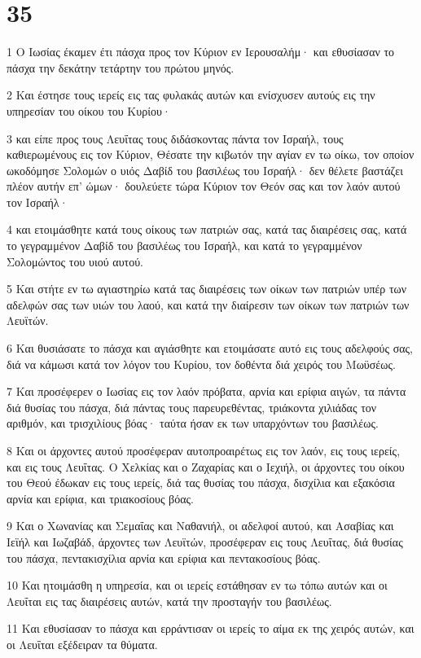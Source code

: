 \chapter{35}

\par 1 Ο Ιωσίας έκαμεν έτι πάσχα προς τον Κύριον εν Ιερουσαλήμ· και εθυσίασαν το πάσχα την δεκάτην τετάρτην του πρώτου μηνός.
\par 2 Και έστησε τους ιερείς εις τας φυλακάς αυτών και ενίσχυσεν αυτούς εις την υπηρεσίαν του οίκου του Κυρίου·
\par 3 και είπε προς τους Λευΐτας τους διδάσκοντας πάντα τον Ισραήλ, τους καθιερωμένους εις τον Κύριον, Θέσατε την κιβωτόν την αγίαν εν τω οίκω, τον οποίον ωκοδόμησε Σολομών ο υιός Δαβίδ του βασιλέως του Ισραήλ· δεν θέλετε βαστάζει πλέον αυτήν επ' ώμων· δουλεύετε τώρα Κύριον τον Θεόν σας και τον λαόν αυτού τον Ισραήλ·
\par 4 και ετοιμάσθητε κατά τους οίκους των πατριών σας, κατά τας διαιρέσεις σας, κατά το γεγραμμένον Δαβίδ του βασιλέως του Ισραήλ, και κατά το γεγραμμένον Σολομώντος του υιού αυτού.
\par 5 Και στήτε εν τω αγιαστηρίω κατά τας διαιρέσεις των οίκων των πατριών υπέρ των αδελφών σας των υιών του λαού, και κατά την διαίρεσιν των οίκων των πατριών των Λευϊτών.
\par 6 Και θυσιάσατε το πάσχα και αγιάσθητε και ετοιμάσατε αυτό εις τους αδελφούς σας, διά να κάμωσι κατά τον λόγον του Κυρίου, τον δοθέντα διά χειρός του Μωϋσέως.
\par 7 Και προσέφερεν ο Ιωσίας εις τον λαόν πρόβατα, αρνία και ερίφια αιγών, τα πάντα διά θυσίας του πάσχα, διά πάντας τους παρευρεθέντας, τριάκοντα χιλιάδας τον αριθμόν, και τρισχιλίους βόας· ταύτα ήσαν εκ των υπαρχόντων του βασιλέως.
\par 8 Και οι άρχοντες αυτού προσέφεραν αυτοπροαιρέτως εις τον λαόν, εις τους ιερείς, και εις τους Λευΐτας. Ο Χελκίας και ο Ζαχαρίας και ο Ιεχιήλ, οι άρχοντες του οίκου του Θεού έδωκαν εις τους ιερείς, διά τας θυσίας του πάσχα, δισχίλια και εξακόσια αρνία και ερίφια, και τριακοσίους βόας.
\par 9 Και ο Χωνανίας και Σεμαΐας και Ναθανιήλ, οι αδελφοί αυτού, και Ασαβίας και Ιεϊήλ και Ιωζαβάδ, άρχοντες των Λευϊτών, προσέφεραν εις τους Λευΐτας, διά θυσίας του πάσχα, πεντακισχίλια αρνία και ερίφια και πεντακοσίους βόας.
\par 10 Και ητοιμάσθη η υπηρεσία, και οι ιερείς εστάθησαν εν τω τόπω αυτών και οι Λευΐται εις τας διαιρέσεις αυτών, κατά την προσταγήν του βασιλέως.
\par 11 Και εθυσίασαν το πάσχα και ερράντισαν οι ιερείς το αίμα εκ της χειρός αυτών, και οι Λευΐται εξέδειραν τα θύματα.
